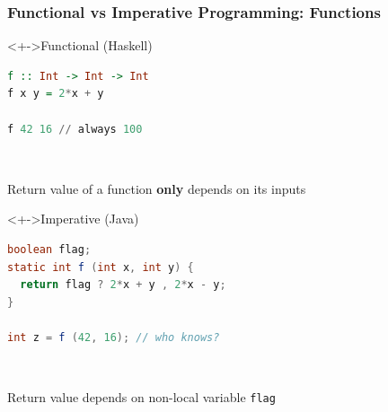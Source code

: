 \documentclass{beamer}
\begin{document}
\begin{frame}[fragile]
  \frametitle{Functional vs Imperative Programming: Functions}
  \begin{block}<+->{Functional (Haskell)}
    \begin{minipage}[t]{0.45\linewidth}
\begin{lstlisting}[language=Haskell]
f :: Int -> Int -> Int
f x y = 2*x + y

f 42 16 // always 100
\end{lstlisting}
    \end{minipage}
    ~
    \begin{minipage}[t]{0.45\linewidth}
      Return value of a function \textbf{only} depends on its inputs
    \end{minipage}
  \end{block}
  \begin{block}<+->{Imperative (Java)}
    \begin{minipage}[t]{0.45\linewidth}
\begin{lstlisting}[language=Java]
boolean flag;
static int f (int x, int y) {
  return flag ? 2*x + y , 2*x - y;
}

int z = f (42, 16); // who knows?
\end{lstlisting}
    \end{minipage}
    ~
    \begin{minipage}[t]{0.45\linewidth}
      Return value depends on non-local variable \texttt{flag}
    \end{minipage}
  \end{block}
\end{frame}
\end{document}
